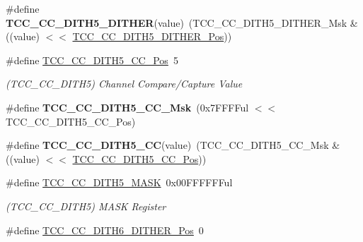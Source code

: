 \begin{DoxyCompactItemize}
\item 
\hypertarget{group___s_a_m_l21___t_c_c_gaf55afdb639aad83c6d52db3d351a5b9b}{}\#define {\bfseries T\+C\+C\+\_\+\+C\+C\+\_\+\+D\+I\+T\+H5\+\_\+\+D\+I\+T\+H\+E\+R}(value)~(T\+C\+C\+\_\+\+C\+C\+\_\+\+D\+I\+T\+H5\+\_\+\+D\+I\+T\+H\+E\+R\+\_\+\+Msk \& ((value) $<$$<$ \hyperlink{group___s_a_m_l21___t_c_c_gad9c8e023604fc91b228eb08efe2560e4}{T\+C\+C\+\_\+\+C\+C\+\_\+\+D\+I\+T\+H5\+\_\+\+D\+I\+T\+H\+E\+R\+\_\+\+Pos}))\label{group___s_a_m_l21___t_c_c_gaf55afdb639aad83c6d52db3d351a5b9b}

\item 
\hypertarget{group___s_a_m_l21___t_c_c_ga94ca01ef8e3a9480f9521c3abe0e1ecb}{}\#define \hyperlink{group___s_a_m_l21___t_c_c_ga94ca01ef8e3a9480f9521c3abe0e1ecb}{T\+C\+C\+\_\+\+C\+C\+\_\+\+D\+I\+T\+H5\+\_\+\+C\+C\+\_\+\+Pos}~5\label{group___s_a_m_l21___t_c_c_ga94ca01ef8e3a9480f9521c3abe0e1ecb}

\begin{DoxyCompactList}\small\item\em (T\+C\+C\+\_\+\+C\+C\+\_\+\+D\+I\+T\+H5) Channel Compare/\+Capture Value \end{DoxyCompactList}\item 
\hypertarget{group___s_a_m_l21___t_c_c_ga111cd3c9ca772e89b1b925bae6d65b1e}{}\#define {\bfseries T\+C\+C\+\_\+\+C\+C\+\_\+\+D\+I\+T\+H5\+\_\+\+C\+C\+\_\+\+Msk}~(0x7\+F\+F\+F\+Ful $<$$<$ T\+C\+C\+\_\+\+C\+C\+\_\+\+D\+I\+T\+H5\+\_\+\+C\+C\+\_\+\+Pos)\label{group___s_a_m_l21___t_c_c_ga111cd3c9ca772e89b1b925bae6d65b1e}

\item 
\hypertarget{group___s_a_m_l21___t_c_c_ga9947cbc79278cadc353b15056f8a971e}{}\#define {\bfseries T\+C\+C\+\_\+\+C\+C\+\_\+\+D\+I\+T\+H5\+\_\+\+C\+C}(value)~(T\+C\+C\+\_\+\+C\+C\+\_\+\+D\+I\+T\+H5\+\_\+\+C\+C\+\_\+\+Msk \& ((value) $<$$<$ \hyperlink{group___s_a_m_l21___t_c_c_ga94ca01ef8e3a9480f9521c3abe0e1ecb}{T\+C\+C\+\_\+\+C\+C\+\_\+\+D\+I\+T\+H5\+\_\+\+C\+C\+\_\+\+Pos}))\label{group___s_a_m_l21___t_c_c_ga9947cbc79278cadc353b15056f8a971e}

\item 
\hypertarget{group___s_a_m_l21___t_c_c_gac59e834e8e022bade7067e6deec3905c}{}\#define \hyperlink{group___s_a_m_l21___t_c_c_gac59e834e8e022bade7067e6deec3905c}{T\+C\+C\+\_\+\+C\+C\+\_\+\+D\+I\+T\+H5\+\_\+\+M\+A\+S\+K}~0x00\+F\+F\+F\+F\+F\+Ful\label{group___s_a_m_l21___t_c_c_gac59e834e8e022bade7067e6deec3905c}

\begin{DoxyCompactList}\small\item\em (T\+C\+C\+\_\+\+C\+C\+\_\+\+D\+I\+T\+H5) M\+A\+S\+K Register \end{DoxyCompactList}\item 
\hypertarget{group___s_a_m_l21___t_c_c_ga2f0c7715b5ecca42767a8cbd7cfa3075}{}\#define \hyperlink{group___s_a_m_l21___t_c_c_ga2f0c7715b5ecca42767a8cbd7cfa3075}{T\+C\+C\+\_\+\+C\+C\+\_\+\+D\+I\+T\+H6\+\_\+\+D\+I\+T\+H\+E\+R\+\_\+\+Pos}~0\label{group___s_a_m_l21___t_c_c_ga2f0c7715b5ecca42767a8cbd7cfa3075}


\end{DoxyCompactItemize}
